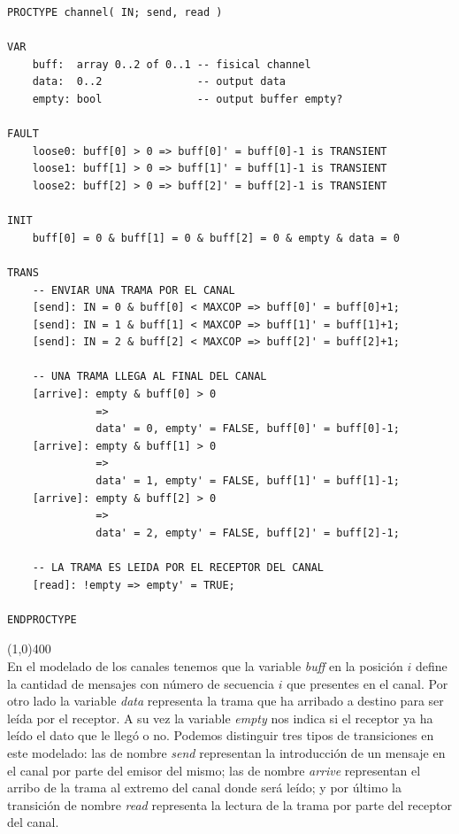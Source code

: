\documentclass[titlepage, 12pt]{book}
\begin{document}
\begin{verbatim}
PROCTYPE channel( IN; send, read )

VAR
    buff:  array 0..2 of 0..1 -- fisical channel
    data:  0..2               -- output data
    empty: bool               -- output buffer empty?

FAULT
    loose0: buff[0] > 0 => buff[0]' = buff[0]-1 is TRANSIENT
    loose1: buff[1] > 0 => buff[1]' = buff[1]-1 is TRANSIENT
    loose2: buff[2] > 0 => buff[2]' = buff[2]-1 is TRANSIENT
    
INIT
    buff[0] = 0 & buff[1] = 0 & buff[2] = 0 & empty & data = 0

TRANS
    -- ENVIAR UNA TRAMA POR EL CANAL
    [send]: IN = 0 & buff[0] < MAXCOP => buff[0]' = buff[0]+1;
    [send]: IN = 1 & buff[1] < MAXCOP => buff[1]' = buff[1]+1;
    [send]: IN = 2 & buff[2] < MAXCOP => buff[2]' = buff[2]+1;

    -- UNA TRAMA LLEGA AL FINAL DEL CANAL
    [arrive]: empty & buff[0] > 0 
              => 
              data' = 0, empty' = FALSE, buff[0]' = buff[0]-1;
    [arrive]: empty & buff[1] > 0 
              => 
              data' = 1, empty' = FALSE, buff[1]' = buff[1]-1;
    [arrive]: empty & buff[2] > 0 
              => 
              data' = 2, empty' = FALSE, buff[2]' = buff[2]-1;

    -- LA TRAMA ES LEIDA POR EL RECEPTOR DEL CANAL
    [read]: !empty => empty' = TRUE;

ENDPROCTYPE

\end{verbatim}

\noindent \line(1,0){400}\\

En el modelado de los canales tenemos que la variable \textit{buff} en la posici\'on $i$ define la cantidad de mensajes con n\'umero de secuencia $i$ que presentes en el canal. Por otro lado la variable \textit{data} representa la trama que ha arribado a destino para ser le\'ida por el receptor. A su vez la variable \textit{empty} nos indica si el receptor ya ha le\'ido el dato que le lleg\'o o no. Podemos distinguir tres tipos de transiciones en este modelado: las de nombre \textit{send} representan la introducci\'on de un mensaje en el canal por parte del emisor del mismo; las de nombre \textit{arrive} representan el arribo de la trama al extremo del canal donde ser\'a le\'ido; y por \'ultimo la transici\'on de nombre \textit{read} representa la lectura de la trama por parte del receptor del canal.\\
\end{document}
